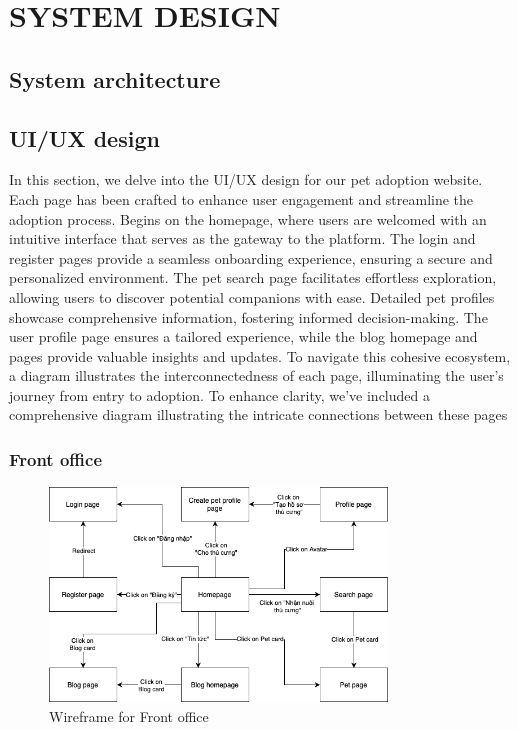 \chapter{SYSTEM DESIGN}



\section{System architecture}

\section{UI/UX design}

In this section, we delve into the UI/UX design for our pet adoption website. Each page has been crafted to enhance user engagement and streamline the adoption process. Begins on the homepage, where users are welcomed with an intuitive interface that serves as the gateway to the platform. The login and register pages provide a seamless onboarding experience, ensuring a secure and personalized environment. The pet search page facilitates effortless exploration, allowing users to discover potential companions with ease. Detailed pet profiles showcase comprehensive information, fostering informed decision-making. The user profile page ensures a tailored experience, while the blog homepage and pages provide valuable insights and updates. To navigate this cohesive ecosystem, a diagram illustrates the interconnectedness of each page, illuminating the user's journey from entry to adoption. To enhance clarity, we've included a comprehensive diagram illustrating the intricate connections between these pages
\subsection{Front office}

\begin{figure}[H]
    \centering
    \includegraphics[width=0.8\textwidth]{Figures/wireframe_fo.png}
    \caption{Wireframe for Front office}
\end{figure}

